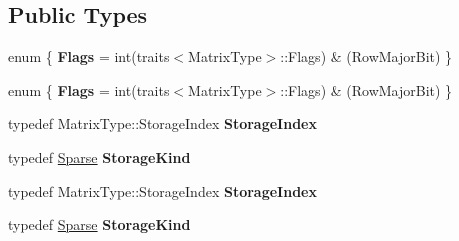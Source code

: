 \subsection*{Public Types}
\begin{DoxyCompactItemize}
\item 
\mbox{\label{struct_eigen_1_1internal_1_1traits_3_01_sparse_view_3_01_matrix_type_01_4_01_4_ab5512412bbb5186020a61ba639ca4c07}} 
enum \{ {\bfseries Flags} = int(traits$<$Matrix\+Type$>$\+:\+:Flags) \& (Row\+Major\+Bit)
 \}
\item 
\mbox{\label{struct_eigen_1_1internal_1_1traits_3_01_sparse_view_3_01_matrix_type_01_4_01_4_afcda668b687079695c40d5e4e1e5c6ab}} 
enum \{ {\bfseries Flags} = int(traits$<$Matrix\+Type$>$\+:\+:Flags) \& (Row\+Major\+Bit)
 \}
\item 
\mbox{\label{struct_eigen_1_1internal_1_1traits_3_01_sparse_view_3_01_matrix_type_01_4_01_4_ac67f7bf924419706f1708c0873101105}} 
typedef Matrix\+Type\+::\+Storage\+Index {\bfseries Storage\+Index}
\item 
\mbox{\label{struct_eigen_1_1internal_1_1traits_3_01_sparse_view_3_01_matrix_type_01_4_01_4_afe350cae0f466205c82b0bce14cf2ff5}} 
typedef \hyperlink{struct_eigen_1_1_sparse}{Sparse} {\bfseries Storage\+Kind}
\item 
\mbox{\label{struct_eigen_1_1internal_1_1traits_3_01_sparse_view_3_01_matrix_type_01_4_01_4_ac67f7bf924419706f1708c0873101105}} 
typedef Matrix\+Type\+::\+Storage\+Index {\bfseries Storage\+Index}
\item 
\mbox{\label{struct_eigen_1_1internal_1_1traits_3_01_sparse_view_3_01_matrix_type_01_4_01_4_afe350cae0f466205c82b0bce14cf2ff5}} 
typedef \hyperlink{struct_eigen_1_1_sparse}{Sparse} {\bfseries Storage\+Kind}
\end{DoxyCompactItemize}


